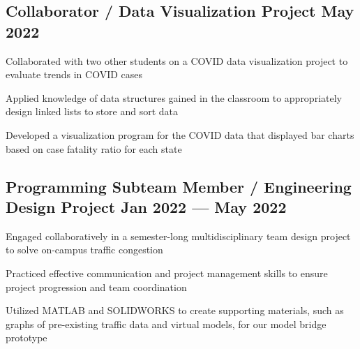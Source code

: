 \subsection{{Collaborator / Data Visualization Project \hfill May 2022}}
\begin{zitemize}
\item Collaborated with two other students on a COVID data visualization project to evaluate trends in COVID cases
\item Applied knowledge of data structures gained in the classroom to appropriately design linked lists to store and sort data
\item Developed a visualization program for the COVID data that displayed bar charts based on case fatality ratio for each state

\end{zitemize}

\subsection{{Programming Subteam Member / Engineering Design Project \hfill Jan 2022 --- May 2022}}
\begin{zitemize}
\item Engaged collaboratively in a semester-long multidisciplinary team design project to solve on-campus traffic congestion
\item Practiced effective communication and project management skills to ensure project progression and team coordination
\item Utilized MATLAB and SOLIDWORKS to create supporting materials, such as graphs of pre-existing traffic data and virtual models, for our model bridge prototype

\end{zitemize}

